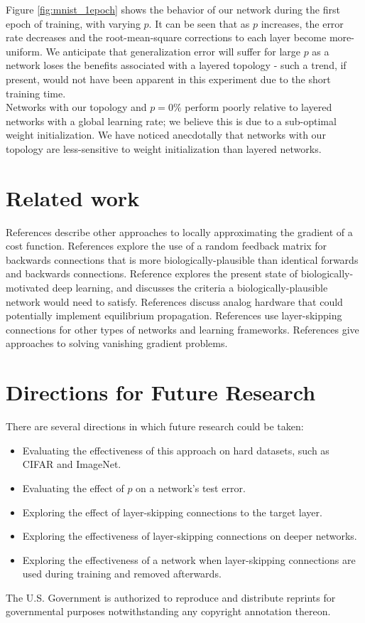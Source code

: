 \documentclass[format=sigconf]{acmart}
\newcommand{\npar}{\\\indent}
\begin{document}
Figure \ref{fig:mnist_1epoch} shows the behavior of our network during the first epoch of training, with varying $p$. It can be seen that as $p$ increases, the error rate decreases and the root-mean-square corrections to each layer become more-uniform. We anticipate that generalization error will suffer for large $p$ as a network loses the benefits associated with a layered topology - such a trend, if present, would not have been apparent in this experiment due to the short training time.
\npar
Networks with our topology and $p=0\%$ perform poorly relative to layered networks with a global learning rate; we believe this is due to a sub-optimal weight initialization. We have noticed anecdotally that networks with our topology are less-sensitive to weight initialization than layered networks.

\section{Related work}
References \cite{lee2015, xie2003, pineda1987} describe other approaches to locally approximating the gradient of a cost function. References \cite{lillicrap2014, @crafton2019} explore the use of a random feedback matrix for backwards connections that is more biologically-plausible than identical forwards and backwards connections. Reference \cite{bartunov2018} explores the present state of biologically-motivated deep learning, and \cite{bengio2015} discusses the criteria a biologically-plausible network would need to satisfy. References \cite{shainline2019, davies2018, nahmias2013} discuss analog hardware that could potentially implement equilibrium propagation. References \cite{he2015, srivastava2015, xiaohu2011, krishnan2019} use layer-skipping connections for other types of networks and learning frameworks. References \cite{ioffe2015, glorot2010} give approaches to solving vanishing gradient problems.

\section{Directions for Future Research}

There are several directions in which future research could be taken:
\begin{itemize} 
\item Evaluating the effectiveness of this approach on hard datasets, such as CIFAR and ImageNet.
\item Evaluating the effect of $p$ on a network's test error.
\item Exploring the effect of layer-skipping connections to the target layer.
\item Exploring the effectiveness of layer-skipping connections on deeper networks.
\item Exploring the effectiveness of a network when layer-skipping connections are used during training and removed afterwards.
\end{itemize}




The U.S. Government is authorized to reproduce and distribute reprints for governmental purposes notwithstanding any copyright annotation thereon.



\end{document}
